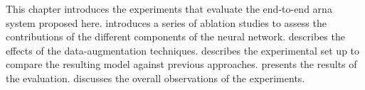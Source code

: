 
This chapter introduces the experiments that evaluate the
end-to-end \gls{arna} system proposed here.
 introduces a series of ablation
studies to assess the contributions of the different
components of the neural network.
 describes the effects of
the data-augmentation techniques.
 describes the
experimental set up to compare the resulting model 
against previous approaches.  presents the
results of the evaluation.  discusses the
overall observations of the experiments. 
